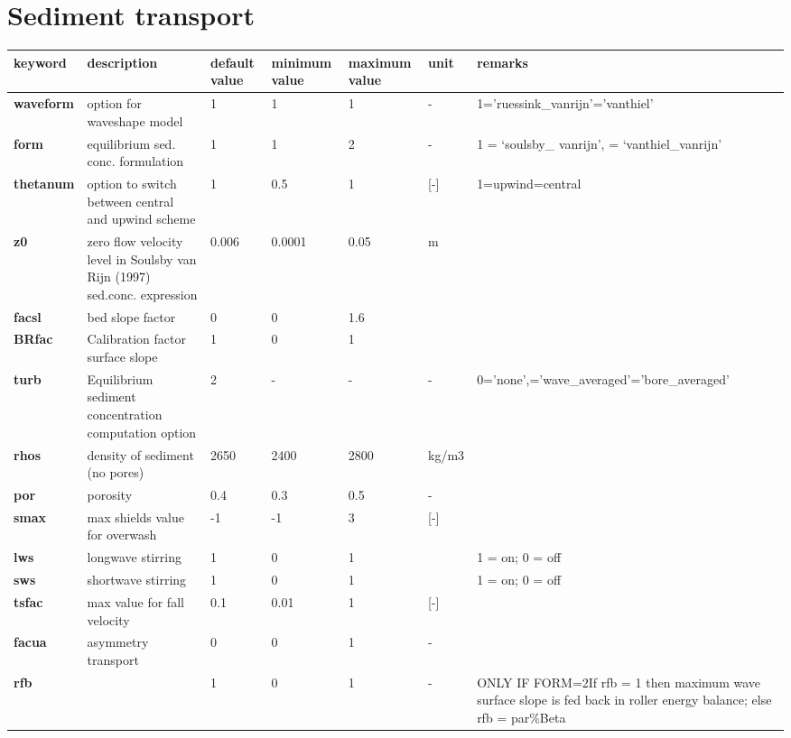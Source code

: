 \section{Sediment transport}

\begin{tabular}{|p{0.6in}|p{0.9in}|p{0.5in}|p{0.5in}|p{0.6in}|p{0.3in}|p{0.6in}|} \hline 
\textbf{keyword} & description & default value & minimum value & maximum value & unit & remarks \\ \hline 
\textbf{waveform} & option for waveshape model & 1 & 1 & 1 & - & 1='ruessink\_vanrijn'\newline 2='vanthiel'  \\ \hline 
\textbf{form} & equilibrium sed. conc. formulation & 1 & 1 & 2 & - & 1 = `soulsby\_ vanrijn',  \newline 2 = \newline `vanthiel\_vanrijn'  \\ \hline 
\textbf{thetanum} & option to switch between central and upwind scheme & 1 & 0.5 & 1 & [-] & 1=upwind\newline 0.5=central \\ \hline 
\textbf{z0       } & zero flow velocity level in Soulsby van Rijn (1997) sed.conc. expression & 0.006 & 0.0001 & 0.05 & m &  \\ \hline 
\textbf{facsl    } & bed slope factor & 0 & 0 & 1.6 &  &  \\ \hline 
\textbf{BRfac} & Calibration factor surface slope & 1 & 0 & 1 &  &  \\ \hline 
\textbf{turb} & Equilibrium sediment concentration computation option & 2 & - & - & - & 0='none',\newline 1='wave\_averaged'\newline 2='bore\_averaged' \\ \hline 
\textbf{rhos     } & density of sediment (no pores) & 2650 & 2400 & 2800 & kg/m3 &  \\ \hline 
\textbf{por      } & porosity & 0.4 & 0.3 & 0.5 & - &  \\ \hline 
\textbf{smax} & max shields value for overwash & -1 & -1 & 3 & [-] &  \\ \hline 
\textbf{lws} & longwave stirring & 1 & 0 & 1 &  & 1 = on; 0 = off \\ \hline 
\textbf{sws} & shortwave stirring & 1 & 0 & 1 &  & 1 = on; 0 = off \\ \hline 
\textbf{tsfac} & max value for fall velocity & 0.1 & 0.01 & 1 & [-] &  \\ \hline 
\textbf{facua} & asymmetry transport & 0 & 0 & 1 & - &  \\ \hline 
\textbf{rfb} &  & 1 & 0 & 1 & - & ONLY IF FORM=2\newline \newline If rfb = 1 then maximum wave surface slope is fed back in roller energy balance; else rfb = par\%Beta     \\ \hline 
\end{tabular}


